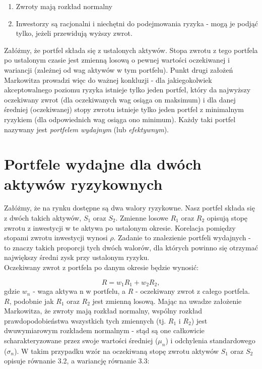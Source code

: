 \documentclass[magister]{dyplom}
\begin{document}
\begin{enumerate}
	\item Zwroty mają rozkład normalny
	\item Inwestorzy są racjonalni i niechętni do podejmowania ryzyka - mogą je podjąć tylko, jeżeli przewidują wyższy zwrot.
\end{enumerate}

Załóżmy, że portfel składa się z ustalonych aktywów. Stopa zwrotu z tego portfela po ustalonym czasie jest zmienną losową o pewnej wartości oczekiwanej i wariancji (zależnej od wag aktywów w tym portfelu).
Punkt drugi założeń Markowitza prowadzi więc do ważnej konkluzji - dla jakiegokolwiek akceptowalnego poziomu ryzyka istnieje tylko jeden portfel, który da najwyższy oczekiwany zwrot (dla oczekiwanych wag osiąga on maksimum) i dla danej średniej (oczekiwanej) stopy zwrotu istnieje tylko jeden portfel z minimalnym ryzykiem (dla odpowiednich wag osiąga ono minimum). Każdy taki portfel nazywany jest \textit{portfelem wydajnym} (lub \textit{efektywnym}).\par

\section{Portfele wydajne dla dwóch aktywów ryzykownych} 

Załóżmy, że na rynku dostępne są dwa walory ryzykowne. Nasz portfel składa się z dwóch takich aktywów, $S_1$ oraz $S_2$. Zmienne losowe $R_1$ oraz $R_2$ opisują stopę zwrotu z inwestycji w te aktywa po ustalonym okresie. Korelacja pomiędzy stopami zwrotu inwestycji wynosi $\rho$. Zadanie to znalezienie portfeli wydajnych - to znaczy takich proporcji tych dwóch walorów, dla których powinno się otrzymać największy średni zysk przy ustalonym ryzyku.\\
Oczekiwany zwrot z portfela po danym okresie będzie wynosić:

\begin{equation}
	R = w_1R_1 + w_2R_2,
\end{equation}
gdzie $w_n$ - waga aktywa n w portfelu, a $R$ - oczekiwany zwrot z całego portfela.\\
$R$, podobnie jak $R_1$ oraz $R_2$ jest zmienną losową. Mając na uwadze założenie Markowitza, że zwroty mają rozkład normalny, wspólny rozkład prawdopodobieństwa wszystkich tych zmiennych (tj. $R_1$ i $R_2$) jest dwuwymiarowym rozkładem normalnym - stąd są one całkowicie scharakteryzowane przez swoje wartości średniej ($\mu_n$) i odchylenia standardowego ($\sigma_n$). W takim przypadku wzór na oczekiwaną stopę zwrotu aktywów $S_1$ oraz $S_2$ opisuje równanie 3.2, a wariancję równanie 3.3:
\end{document}

